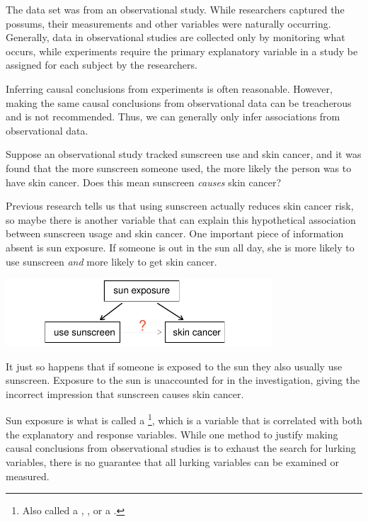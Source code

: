 The  data set was from an observational study. While researchers captured the possums, their measurements and other variables were naturally occurring. Generally, data in observational studies are collected only by monitoring what occurs, while experiments require the primary explanatory variable in a study be assigned for each subject by the researchers.

Inferring causal conclusions from experiments is often reasonable. However, making the same causal conclusions from observational data can be treacherous and is not recommended. Thus, we can generally only infer associations from observational data.

\begin{exercise} \label{sunscreenLurkingExample}
Suppose an observational study tracked sunscreen use and skin cancer, and it was found that the more sunscreen someone used, the more likely the person was to have skin cancer. Does this mean sunscreen \emph{causes} skin cancer?
\end{exercise}

Previous research tells us that using sunscreen actually reduces skin cancer risk, so maybe there is another variable that can explain this hypothetical association between sunscreen usage and skin cancer. One important piece of information absent is sun exposure. If someone is out in the sun all day, she is more likely to use sunscreen \emph{and} more likely to get skin cancer.
\begin{center}
\includegraphics[height=1.0in]{01/figures/variables/sunCausesCancer}
\end{center}
It just so happens that if someone is exposed to the sun they also usually use sunscreen. Exposure to the sun is unaccounted for in the investigation, giving the incorrect impression that sunscreen causes skin cancer.

Sun exposure is what is called a \footnote{Also called a , , or a .}, which is a variable that is correlated with both the explanatory and response variables. While one method to justify making causal conclusions from observational studies is to exhaust the search for lurking variables, there is no guarantee that all lurking variables can be examined or measured.

